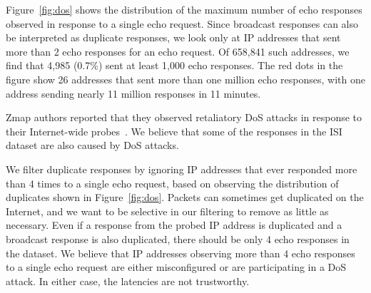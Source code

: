 Figure~\ref{fig:dos} shows the distribution of the maximum number of
echo responses observed in response to a single echo request. Since
broadcast responses can also be interpreted as duplicate responses, we
look only at IP addresses that sent more than 2 echo responses for an
echo request. Of 658,841 such addresses, we find that 4,985 (0.7\%) sent
at least 1,000 echo responses. The red dots in the figure show 26
addresses that sent more than one million echo
responses, with one address sending nearly 11 million responses in 11 minutes.

Zmap authors reported that they observed
retaliatory DoS attacks
in response to their Internet-wide probes~\cite{durumeric2013zmap}. We believe that
some of the responses in the ISI dataset are also caused by DoS attacks.

We filter duplicate responses by ignoring IP addresses that ever
responded more than 4 times to a single echo request, based on observing the
distribution of duplicates shown in Figure~\ref{fig:dos}.  Packets can
sometimes get duplicated on the Internet, and we want to be selective
in our filtering to remove as little as necessary.  Even if a response from
the probed IP address is duplicated and a broadcast response is also
duplicated, there should be only 4 echo responses in the dataset. We
believe that IP addresses observing more than 4 echo responses to a
single echo request are either misconfigured or are participating in a DoS attack.
In either case, the latencies are not trustworthy.

